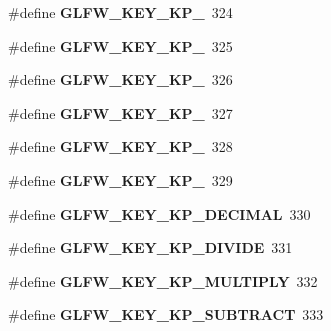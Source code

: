 \begin{DoxyCompactItemize}
\item 
\mbox{\label{group__keys_gada7ec86778b85e0b4de0beea72234aea}} 
\#define {\bfseries G\+L\+F\+W\+\_\+\+K\+E\+Y\+\_\+\+K\+P\+\_}~324
\item 
\mbox{\label{group__keys_ga9a5be274434866c51738cafbb6d26b45}} 
\#define {\bfseries G\+L\+F\+W\+\_\+\+K\+E\+Y\+\_\+\+K\+P\+\_}~325
\item 
\mbox{\label{group__keys_gafc141b0f8450519084c01092a3157faa}} 
\#define {\bfseries G\+L\+F\+W\+\_\+\+K\+E\+Y\+\_\+\+K\+P\+\_}~326
\item 
\mbox{\label{group__keys_ga8882f411f05d04ec77a9563974bbfa53}} 
\#define {\bfseries G\+L\+F\+W\+\_\+\+K\+E\+Y\+\_\+\+K\+P\+\_}~327
\item 
\mbox{\label{group__keys_gab2ea2e6a12f89d315045af520ac78cec}} 
\#define {\bfseries G\+L\+F\+W\+\_\+\+K\+E\+Y\+\_\+\+K\+P\+\_}~328
\item 
\mbox{\label{group__keys_gafb21426b630ed4fcc084868699ba74c1}} 
\#define {\bfseries G\+L\+F\+W\+\_\+\+K\+E\+Y\+\_\+\+K\+P\+\_}~329
\item 
\mbox{\label{group__keys_ga4e231d968796331a9ea0dbfb98d4005b}} 
\#define {\bfseries G\+L\+F\+W\+\_\+\+K\+E\+Y\+\_\+\+K\+P\+\_\+\+D\+E\+C\+I\+M\+AL}~330
\item 
\mbox{\label{group__keys_gabca1733780a273d549129ad0f250d1e5}} 
\#define {\bfseries G\+L\+F\+W\+\_\+\+K\+E\+Y\+\_\+\+K\+P\+\_\+\+D\+I\+V\+I\+DE}~331
\item 
\mbox{\label{group__keys_ga9ada267eb0e78ed2ada8701dd24a56ef}} 
\#define {\bfseries G\+L\+F\+W\+\_\+\+K\+E\+Y\+\_\+\+K\+P\+\_\+\+M\+U\+L\+T\+I\+P\+LY}~332
\item 
\mbox{\label{group__keys_gaa3dbd60782ff93d6082a124bce1fa236}} 
\#define {\bfseries G\+L\+F\+W\+\_\+\+K\+E\+Y\+\_\+\+K\+P\+\_\+\+S\+U\+B\+T\+R\+A\+CT}~333
\item 
\mbox{\label{group__keys_gad09c7c98acc79e89aa6a0a91275becac}} 

\end{DoxyCompactItemize}

